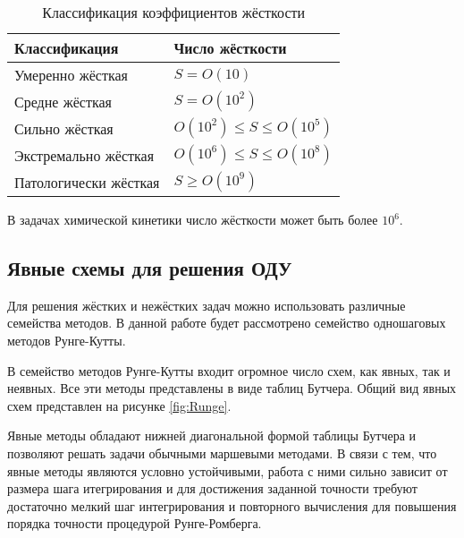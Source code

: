 \begin{table}    
    \caption{Классификация коэффициентов жёсткости}
    \begin{tabularx}{\textwidth}{|X|X|}
    \hline
    Классификация & Число жёсткости\\
    \hline
    Умеренно жёсткая & $S = O(10)$\\
    \hline
    Средне жёсткая & $S = O(10^2)$\\
    \hline
    Сильно жёсткая & $O(10^2) \leq S \leq O(10^5)$\\
    \hline
    Экстремально жёсткая & $O(10^6) \leq S \leq O(10^8)$\\
    \hline
    Патологически жёсткая & $S \geq O(10^9)$\\
    \hline
    \end{tabularx}
    \label{tab:ToughCoeff}
\end{table}

В задачах химической кинетики число жёсткости может быть более $10^6$.

\subsection{Явные схемы для решения ОДУ}

Для решения жёстких и нежёстких задач можно использовать различные семейства методов. В данной работе будет рассмотрено семейство
одношаговых методов Рунге-Кутты.

В семейство методов Рунге-Кутты входит огромное число схем, как явных, так и неявных. Все эти методы представлены в виде таблиц
Бутчера. Общий вид явных схем представлен на рисунке \ref{fig:Runge}.

Явные методы обладают нижней диагональной формой таблицы Бутчера и позволяют решать задачи обычными маршевыми методами. В связи с тем,
что явные методы являются условно устойчивыми, работа с ними сильно зависит от размера шага итегрирования и для достижения заданной
точности требуют достаточно мелкий шаг интегрирования и повторного вычисления для повышения порядка точности процедурой Рунге-Ромберга.



